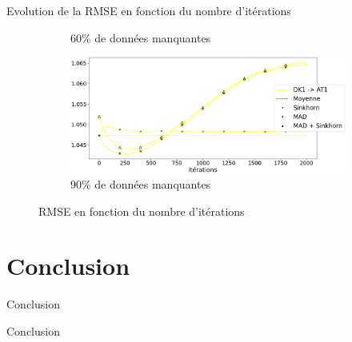 \documentclass{beamer}
\begin{document}
\begin{frame}{Evolution de la RMSE en fonction du nombre d'itérations}
\begin{center}
{\begin{minipage}{1.2\linewidth}
\begin{figure}[H]
\begin{subfigure}[b]{0.4\textwidth}
                        \caption{60\% de données manquantes}
                        \label{60_biais_DK1}
                    \end{subfigure}
                    \hfill
                    \begin{subfigure}[b]{0.4\textwidth}
                        \centering
                        \includegraphics[scale=0.14]{images/90_biais_AT1.png}
                        \caption{90\% de données manquantes}
                        \label{90_biais_AT1}
                    \end{subfigure}
                    \caption{RMSE en fonction du nombre d'itérations}
                \end{figure}
            \end{minipage}%
        }
    \end{center}
\end{frame}

\section{Conclusion}
\begin{frame}{Conclusion}
    \Huge{\centerline{Conclusion}}
\end{frame}

\end{document}
